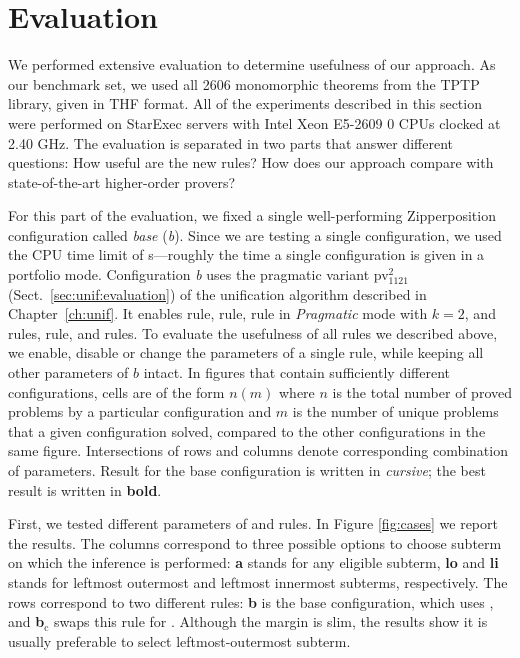 \section{Evaluation} 
\label{sect:bool:eval}

We performed extensive evaluation to determine usefulness of our approach. As
our benchmark set, we used all 2606 monomorphic theorems from the TPTP library,
given in THF format. All of the experiments described in this section were
performed on StarExec \cite{sst-14-starexec} servers with Intel Xeon E5-2609 0 CPUs clocked at 2.40 GHz. The evaluation is separated in two parts that
answer different questions: How useful are the new rules? How 
does our approach compare with state-of-the-art higher-order provers?

For this part of the evaluation, we fixed a single well-performing Zipperposition configuration
called \emph{base} (\emph{b}). Since we are testing a single configuration, we
used the CPU time limit of  s---roughly the time a single configuration is
given in a portfolio mode. Configuration \emph{b} uses the pragmatic variant
pv$_{1121}^{2}$ (Sect.~\ref{sec:unif:evaluation}) of the unification algorithm described in Chapter~\ref{ch:unif}. 
It enables  rule,
 rule,  rule in \emph{Pragmatic} mode with $k=2$,
 and  rules,  rule, and  rules. 
To evaluate the usefulness of
all rules we described above, we enable, disable or change the
parameters of a single rule, while keeping all other parameters of $b$ intact. 
In figures that contain sufficiently different configurations, cells are of the form $n (m)$ where $n$ is the total
number of proved problems by a particular configuration and $m$ is the number of
unique problems that a given configuration solved, compared to the other
configurations in the same figure. Intersections of rows and columns
denote corresponding combination of parameters.
Result for the base configuration is written in \emph{cursive}; the best result
is written in \textbf{bold}.

First, we tested different parameters of  and 
rules. In Figure \ref{fig:cases} we report the results. The columns correspond to
three possible options to choose subterm on which the inference is performed:
\textbf{a} stands for any eligible subterm, \textbf{lo} and \textbf{li} stands
for leftmost outermost and leftmost innermost subterms, respectively. The rows
correspond to two different rules: 
\textbf{b} is the base configuration, which uses , and \textbf{b$_\text{c}$}
swaps this rule for . Although the margin is slim, the results show it is usually preferable to select leftmost-outermost
subterm.

